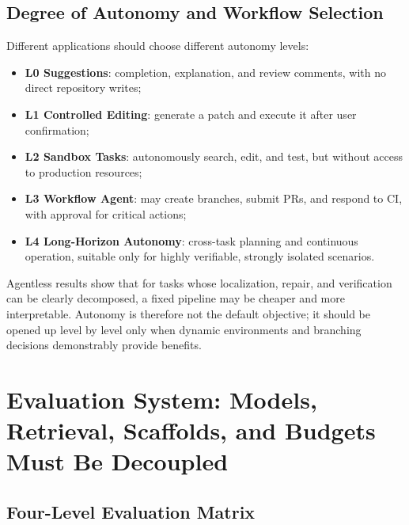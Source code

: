 \documentclass[10pt,a4paper,UTF8,fontset=none]{ctexart}
\begin{document}
\subsection{Degree of Autonomy and Workflow Selection}

Different applications should choose different autonomy levels:

\begin{itemize}
  \item \textbf{L0 Suggestions}: completion, explanation, and review comments, with no direct repository writes;
  \item \textbf{L1 Controlled Editing}: generate a patch and execute it after user confirmation;
  \item \textbf{L2 Sandbox Tasks}: autonomously search, edit, and test, but without access to production resources;
  \item \textbf{L3 Workflow Agent}: may create branches, submit PRs, and respond to CI, with approval for critical actions;
  \item \textbf{L4 Long-Horizon Autonomy}: cross-task planning and continuous operation, suitable only for highly verifiable, strongly isolated scenarios.
\end{itemize}

Agentless results show that for tasks whose localization, repair, and verification can be clearly decomposed, a fixed pipeline may be cheaper and more interpretable\cite{xia2024agentless}. Autonomy is therefore not the default objective; it should be opened up level by level only when dynamic environments and branching decisions demonstrably provide benefits.

\section{Evaluation System: Models, Retrieval, Scaffolds, and Budgets Must Be Decoupled}

\subsection{Four-Level Evaluation Matrix}
\end{document}
